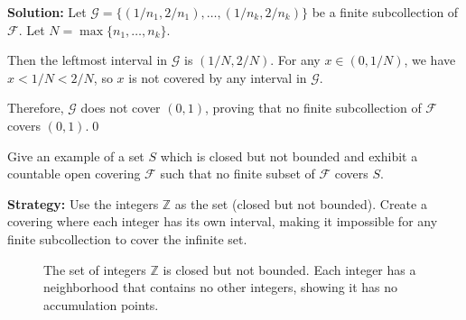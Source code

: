 \bigskip\noindent\textbf{Solution:} Let $\mathcal{G} = \{(1/n_1, 2/n_1), \ldots, (1/n_k, 2/n_k)\}$ be a finite subcollection of $\mathcal{F}$. Let $N = \max\{n_1, \ldots, n_k\}$.

Then the leftmost interval in $\mathcal{G}$ is $(1/N, 2/N)$. For any $x \in (0, 1/N)$, we have $x < 1/N < 2/N$, so $x$ is not covered by any interval in $\mathcal{G}$.

Therefore, $\mathcal{G}$ does not cover $(0,1)$, proving that no finite subcollection of $\mathcal{F}$ covers $(0,1)$.\qed


\begin{problembox}
Give an example of a set \( S \) which is closed but not bounded and exhibit a countable open covering \( \mathcal{F} \) such that no finite subset of \( \mathcal{F} \) covers \( S \).
\end{problembox}

\noindent\textbf{Strategy:} Use the integers $\mathbb{Z}$ as the set (closed but not bounded). Create a covering where each integer has its own interval, making it impossible for any finite subcollection to cover the infinite set.

\begin{figure}[h]
\centering
{}
\caption{The set of integers $\mathbb{Z}$ is closed but not bounded. Each integer has a neighborhood that contains no other integers, showing it has no accumulation points.}
\end{figure}

